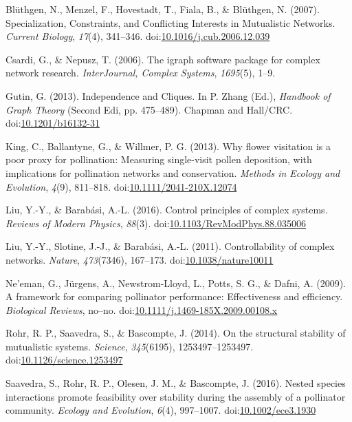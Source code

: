 \documentclass[a4paper]{artikel1}
\theoremstyle{definition}
\theoremstyle{definition}
\theoremstyle{definition}
\theoremstyle{remark}
\begin{document}
\hypertarget{ref-bluthgen_specialization_2007}{}
Blüthgen, N., Menzel, F., Hovestadt, T., Fiala, B., \& Blüthgen, N.
(2007). Specialization, Constraints, and Conflicting Interests in
Mutualistic Networks. \emph{Current Biology}, \emph{17}(4), 341--346.
doi:\href{https://doi.org/10.1016/j.cub.2006.12.039}{10.1016/j.cub.2006.12.039}

\hypertarget{ref-Csardi2006a}{}
Csardi, G., \& Nepusz, T. (2006). The igraph software package for
complex network research. \emph{InterJournal, Complex Systems},
\emph{1695}(5), 1--9.

\hypertarget{ref-Gutin2013}{}
Gutin, G. (2013). Independence and Cliques. In P. Zhang (Ed.),
\emph{Handbook of Graph Theory} (Second Edi, pp. 475--489). Chapman and
Hall/CRC.
doi:\href{https://doi.org/10.1201/b16132-31}{10.1201/b16132-31}

\hypertarget{ref-king_why_2013}{}
King, C., Ballantyne, G., \& Willmer, P. G. (2013). Why flower
visitation is a poor proxy for pollination: Measuring single-visit
pollen deposition, with implications for pollination networks and
conservation. \emph{Methods in Ecology and Evolution}, \emph{4}(9),
811--818.
doi:\href{https://doi.org/10.1111/2041-210X.12074}{10.1111/2041-210X.12074}

\hypertarget{ref-liu_control_2016}{}
Liu, Y.-Y., \& Barabási, A.-L. (2016). Control principles of complex
systems. \emph{Reviews of Modern Physics}, \emph{88}(3).
doi:\href{https://doi.org/10.1103/RevModPhys.88.035006}{10.1103/RevModPhys.88.035006}

\hypertarget{ref-liu_controllability_2011}{}
Liu, Y.-Y., Slotine, J.-J., \& Barabási, A.-L. (2011). Controllability
of complex networks. \emph{Nature}, \emph{473}(7346), 167--173.
doi:\href{https://doi.org/10.1038/nature10011}{10.1038/nature10011}

\hypertarget{ref-neeman_framework_2009}{}
Ne'eman, G., Jürgens, A., Newstrom-Lloyd, L., Potts, S. G., \& Dafni, A.
(2009). A framework for comparing pollinator performance: Effectiveness
and efficiency. \emph{Biological Reviews}, no--no.
doi:\href{https://doi.org/10.1111/j.1469-185X.2009.00108.x}{10.1111/j.1469-185X.2009.00108.x}

\hypertarget{ref-rohr_structural_2014}{}
Rohr, R. P., Saavedra, S., \& Bascompte, J. (2014). On the structural
stability of mutualistic systems. \emph{Science}, \emph{345}(6195),
1253497--1253497.
doi:\href{https://doi.org/10.1126/science.1253497}{10.1126/science.1253497}

\hypertarget{ref-saavedra_nested_2016}{}
Saavedra, S., Rohr, R. P., Olesen, J. M., \& Bascompte, J. (2016).
Nested species interactions promote feasibility over stability during
the assembly of a pollinator community. \emph{Ecology and Evolution},
\emph{6}(4), 997--1007.
doi:\href{https://doi.org/10.1002/ece3.1930}{10.1002/ece3.1930}
\end{document}
